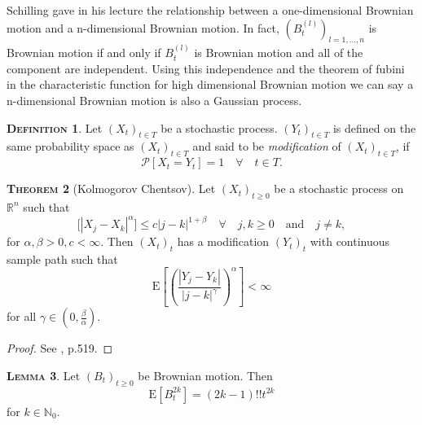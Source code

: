 \documentclass[a4paper, twoside, 11pt]{article}
\theoremstyle{definition}
\newtheorem{definition}{\scshape Definition}[section]
\newtheorem{theorem}[definition]{\scshape Theorem}
\newtheorem{lemma}[definition]{\scshape Lemma}
\begin{document}
Schilling gave in his lecture \cite{shilling} the relationship between a one-dimensional Brownian motion and a n-dimensional Brownian motion.
In fact, $(B_t^{(l)})_{l=1,\dots,n}$ is Brownian motion if and only if $B_t^{(l)}$ is Brownian motion and all of the component are independent. Using this independence and the theorem of fubini in the characteristic function for high dimensional Brownian motion we can say a n-dimensional Brownian motion is also a Gaussian process.

\begin{definition}
  Let $(X_t)_{t\in T}$  be a stochastic process. $(Y_t)_{t\in T}$ is defined on the same probability space as $(X_t)_{t\in T}$ and said to be \emph{modification} of $(X_t)_{t\in T}$, if
  \begin{equation*}
	\mathcal{P}[X_t = Y_t] = 1 \hspace{1em} \forall \hspace{1em} t\in T.
  \end{equation*}
\end{definition}

\begin{theorem}[Kolmogorov Chentsov]
   Let $(X_t)_{t \ge 0}$ be a stochastic process on $\mathbb{R}^{n}$ such that
  \begin{equation*}
	\mathrm[|X_j - X_k|^\alpha] \le c |j - k|^{1+\beta} \hspace{1em}\forall \hspace{1em} j ,k \ge 0 \hspace{1em} \text{and} \hspace{1em} j\neq k,
  \end{equation*}
  for $\alpha, \beta > 0, c < \infty$. Then $(X_t)_t$ has a modification $(Y_t)_t$ with continuous sample path such that 
  \begin{equation*}
	\mathrm{E}[(\frac{|Y_j - Y_k|}{|j - k|^\gamma})^\alpha] < \infty
  \end{equation*}
  for all $\gamma \in (0, \frac{\beta}{\alpha})$.
  \label{sec:kolch}
\end{theorem}
\begin{proof}
  See \cite{loeve}, p.519.
\end{proof}

\begin{lemma}
   Let $(B_t)_{t\ge 0}$ be Brownian motion. Then
   \begin{equation*}
	 \mathrm{E}[B_t^{2k}] = (2k - 1)!! t^{2k}
   \end{equation*}
   for $k \in \mathbb{N}_0$.
   \label{sec:le1}
\end{lemma}
\end{document}
